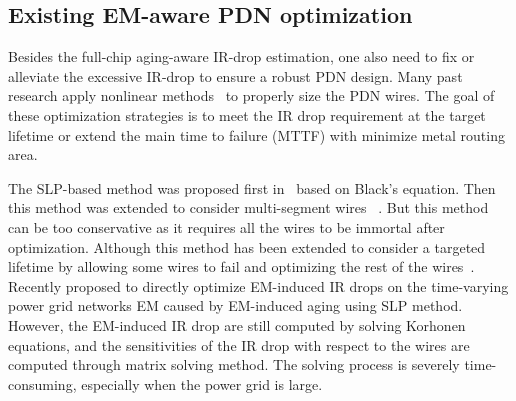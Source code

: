 \subsection{Existing EM-aware PDN optimization}
 \label{subsec:exist_pgfix}
 Besides the full-chip aging-aware IR-drop estimation, one also need to fix or alleviate the excessive IR-drop to ensure a robust PDN design. Many past research apply nonlinear methods~\cite{ChBr:TCAD'88,DuMa:DAC'89,Tan:DAC'99,Wang:TCAD'05,ZhouSun:TVLSI'19, Sukharev:2019pg} to properly size the PDN wires. The goal of these optimization strategies is to meet the IR drop requirement at the target lifetime or extend the main time to failure (MTTF) with minimize metal routing area.

The SLP-based method was proposed first in~\cite{Tan:DAC'99} based on Black's equation. Then this method was extended to consider multi-segment wires ~\cite{ZhouSun:ASPDAC'18}. But this method can be too conservative as it requires all the wires to be immortal after optimization. Although this method has been extended to consider a targeted lifetime by allowing some wires to fail and optimizing the rest of the wires~\cite{ZhouSun:TVLSI'19}.  Recently \cite{Sukharev:2019pg} proposed to directly optimize EM-induced IR drops on the time-varying power grid networks EM caused by EM-induced aging using SLP method. However, the EM-induced IR drop are still computed by solving Korhonen equations, and the sensitivities of the IR drop with respect to the wires are computed through matrix solving method.  
The solving process is severely time-consuming, especially when the power grid is large.


